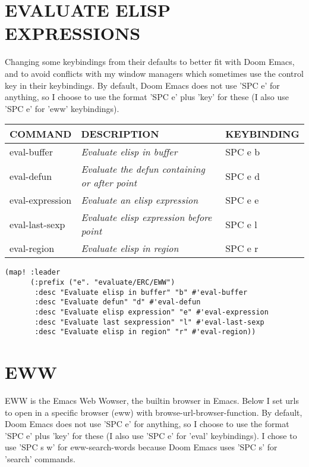 \documentclass[11pt]{article}
\begin{document}
\section{EVALUATE ELISP EXPRESSIONS}
\label{sec:org821ac22}
Changing some keybindings from their defaults to better fit with Doom Emacs, and to avoid conflicts with my window managers which sometimes use the control key in their keybindings.  By default, Doom Emacs does not use 'SPC e' for anything, so I choose to use the format 'SPC e' plus 'key' for these (I also use 'SPC e' for 'eww' keybindings).

\begin{center}
\begin{tabular}{lll}
COMMAND & DESCRIPTION & KEYBINDING\\[0pt]
\hline
eval-buffer & \emph{Evaluate elisp in buffer} & SPC e b\\[0pt]
eval-defun & \emph{Evaluate the defun containing or after point} & SPC e d\\[0pt]
eval-expression & \emph{Evaluate an elisp expression} & SPC e e\\[0pt]
eval-last-sexp & \emph{Evaluate elisp expression before point} & SPC e l\\[0pt]
eval-region & \emph{Evaluate elisp in region} & SPC e r\\[0pt]
\end{tabular}
\end{center}

\begin{verbatim}
(map! :leader
      (:prefix ("e". "evaluate/ERC/EWW")
       :desc "Evaluate elisp in buffer" "b" #'eval-buffer
       :desc "Evaluate defun" "d" #'eval-defun
       :desc "Evaluate elisp expression" "e" #'eval-expression
       :desc "Evaluate last sexpression" "l" #'eval-last-sexp
       :desc "Evaluate elisp in region" "r" #'eval-region))
\end{verbatim}

\section{EWW}
\label{sec:org2025dd9}
EWW is the Emacs Web Wowser, the builtin browser in Emacs.  Below I set urls to open in a specific browser (eww) with browse-url-browser-function.  By default, Doom Emacs does not use 'SPC e' for anything, so I choose to use the format 'SPC e' plus 'key' for these (I also use 'SPC e' for 'eval' keybindings).  I chose to use 'SPC s w' for eww-search-words because Doom Emacs uses 'SPC s' for 'search' commands.
\end{document}
